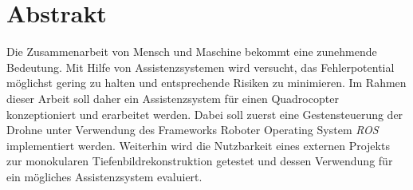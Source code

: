 \chapter*{Abstrakt} 
Die Zusammenarbeit von Mensch und Maschine bekommt eine zunehmende Bedeutung. Mit Hilfe von Assistenzsystemen wird versucht, das Fehlerpotential möglichst gering zu halten und entsprechende Risiken zu minimieren. \newline
Im Rahmen dieser Arbeit soll daher ein Assistenzsystem für einen Quadrocopter konzeptioniert und erarbeitet werden. Dabei soll zuerst eine Gestensteuerung der Drohne unter Verwendung des Frameworks Roboter Operating System \emph{ROS} implementiert werden. Weiterhin wird die Nutzbarkeit eines externen Projekts zur monokularen Tiefenbildrekonstruktion getestet und dessen Verwendung für ein mögliches Assistenzsystem evaluiert. 

